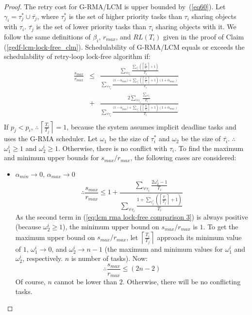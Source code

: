 \documentclass[12pt,english]{report}
\newtheorem{proof}{Proof}
\begin{document}
\begin{proof}\normalfont

The retry cost for G-RMA/LCM is upper bounded by~(\ref{eq60}). Let $\gamma_{i}=\tau_{j}^{*}\cup\bar{\tau_{j}}$,
where $\tau_{j}^{*}$ is the set of higher priority tasks than $\tau_{i}$
sharing objects with $\tau_{i}$. $\bar{\tau_{j}}$ is the set
of lower priority tasks than $\tau_{i}$ sharing objects with
it. We follow the same definitions of $\beta_{i},\, r_{max}$, and
$RL(T_{i})$ given in the proof of Claim (\ref{gedf-lcm-lock-free_clm}).
Schedulability of G-RMA/LCM equals or exceeds the schedulability of retry-loop
lock-free algorithm if:
\begin{eqnarray}
\frac{s_{max}}{r_{max}} & \le & \frac{\sum_{\forall\tau_{i}}\frac{\sum_{\tau_{j}^{*}}\left(\left\lceil \frac{T_{i}}{T_{j}}\right\rceil +1\right)}{T_{i}}}{\sum_{\forall\tau_{i}}\frac{\Big(1-\alpha_{min}\Big)+\sum_{\tau_{j}^{*}}\left(\left\lceil \frac{T_{i}}{T_{j}}\right\rceil +1\right)\left(1+\alpha_{max}\right)}{T_{i}}}\nonumber\\
 & + & \frac{2\sum_{\forall\tau_{i}}\frac{\sum_{\forall\bar{\tau_{j}}}}{T_{i}}}{\sum_{\forall\tau_{i}}\frac{\Big(1-\alpha_{min}\Big)+\sum_{\tau_{j}^{*}}\left(\left\lceil \frac{T_{i}}{T_{j}}\right\rceil +1\right)\left(1+\alpha_{max}\right)}{T_{i}}}\nonumber\\
 & & \label{eq:lcm rma lock-free comparison 1} 
\end{eqnarray}
If $p_{j}<p_{i},\,\therefore\,\left\lceil \frac{T_{i}}{T_{j}}\right\rceil =1$, 
because the system assumes implicit deadline tasks and uses the G-RMA
scheduler. 
%
Let $\omega_{1}$ be the size of $\tau_i^*$ and $\omega_{2}$
be the size of $\bar{\tau_i}$. $\therefore$ $\omega_{1}^{i}\ge 1$ and $\omega_{2}^{i}\ge1$.
Otherwise, there is no conflict with $\tau_{i}$. To find the maximum
and minimum upper bounds for $s_{max}/r_{max}$, the following cases
are considered:
\begin{itemize}
\item $\alpha_{min}\rightarrow0,\,\alpha_{max}\rightarrow0$
\begin{equation}
\therefore\frac{s_{max}}{r_{max}}\le1+\frac{\sum_{\forall\tau_{i}}\frac{2\omega_{2}^{i}-1}{T_{i}}}{\sum_{\forall\tau_{i}}\frac{1+\sum_{\tau_{j}^{*}}\left(\left\lceil \frac{T_{i}}{T_{j}}\right\rceil +1\right)}{T_{i}}}\label{eq:lcm rma lock-free comparison 3}
\end{equation}
As the second term in (\ref{eq:lcm rma lock-free comparison 3}) is
always positive (because $\omega_{2}^{i}\ge1$), the minimum
upper bound on $s_{max}/r_{max}$ is $1$. To get the maximum upper
bound on $s_{max}/r_{max}$, let $\left\lceil \frac{T_{i}}{T_{j}}\right\rceil $
approach its minimum value of $1$, $\omega_{1}^{i}\rightarrow0$, and $\omega_{2}^{i}\rightarrow n-1$ 
(the maximum and minimum values for $\omega_{1}^{i}$ and $\omega_{2}^{i}$, 
respectively. $n$ is number of tasks). Now:
\[
\therefore\frac{s_{max}}{r_{max}}\le\left(2n-2\right)
\]
Of course, $n$ cannot be lower than $2$. Otherwise, there will be
no conflicting tasks.


\end{itemize}
\end{proof}
\end{document}
